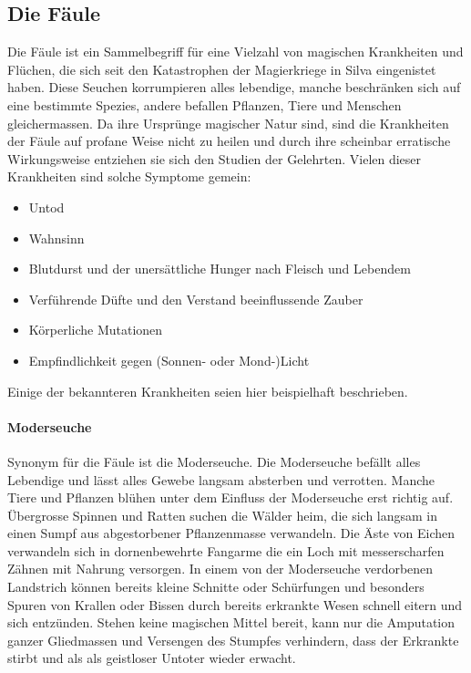 \documentclass[10pt,twoside,twocolumn,openany]{book}
\begin{document}
\begin{multicols}{2}
\subsection{Die Fäule}
Die Fäule ist ein Sammelbegriff für eine Vielzahl von magischen Krankheiten und Flüchen, die sich seit den Katastrophen der Magierkriege in Silva eingenistet haben. Diese Seuchen korrumpieren alles lebendige, manche beschränken sich auf eine bestimmte Spezies, andere befallen Pflanzen, Tiere und Menschen gleichermassen. Da ihre Ursprünge magischer Natur sind, sind die Krankheiten der Fäule auf profane Weise nicht zu heilen und durch ihre scheinbar erratische Wirkungsweise entziehen sie sich den Studien der Gelehrten. Vielen dieser Krankheiten sind solche Symptome gemein:
\begin{itemize}
	\item Untod
	\item Wahnsinn
	\item Blutdurst und der unersättliche Hunger nach Fleisch und Lebendem
	\item Verführende Düfte und den Verstand beeinflussende Zauber
	\item Körperliche Mutationen
	\item Empfindlichkeit gegen (Sonnen- oder Mond-)Licht
\end{itemize}



Einige der bekannteren Krankheiten seien hier beispielhaft beschrieben.

\paragraph{Moderseuche}
Synonym für die Fäule ist die Moderseuche. Die Moderseuche befällt alles Lebendige und lässt alles Gewebe langsam absterben und verrotten. Manche Tiere und Pflanzen blühen unter dem Einfluss der Moderseuche erst richtig auf. Übergrosse Spinnen und Ratten suchen die Wälder heim, die sich langsam in einen Sumpf aus abgestorbener Pflanzenmasse verwandeln. Die Äste von Eichen verwandeln sich in dornenbewehrte Fangarme die ein Loch mit messerscharfen Zähnen mit Nahrung versorgen. In einem von der Moderseuche verdorbenen Landstrich können bereits kleine Schnitte oder Schürfungen und besonders Spuren von Krallen oder Bissen durch bereits erkrankte Wesen schnell eitern und sich entzünden. Stehen keine magischen Mittel bereit, kann nur die Amputation ganzer Gliedmassen und Versengen des Stumpfes verhindern, dass der Erkrankte stirbt und als als geistloser Untoter wieder erwacht.


\end{multicols}
\end{document}
